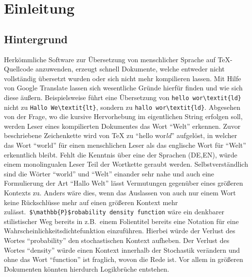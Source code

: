\section{Einleitung}
\subsection{Hintergrund}\label{einleitung:hintergrund}
Herkömmliche Software zur Übersetzung von menschlicher Sprache auf \TeX{}-Quellcode anzuwenden, erzeugt schnell Dokumente, welche entweder nicht vollständig übersetzt wurden oder sich nicht mehr kompilieren lassen. Mit Hilfe von Google Translate lassen sich wesentliche Gründe hierfür finden und wie sich diese äußern. Beispielsweise führt eine Übersetzung von \verb|hello wor\textit{ld}| nicht zu \verb|Hallo We\textit{lt}|, sondern zu \verb|hallo wor\textit{ld}|. Abgesehen von der Frage, wo die kursive Hervorhebung im eigentlichen String erfolgen soll, werden Leser eines kompilierten Dokumentes das Wort \enquote{Welt} erkennen. Zuvor beschriebene Zeichenkette wird von \TeX{} zu \enquote{hello wor\textit{ld}} aufgelöst, in welcher das Wort \enquote{world} für einen menschlichen Leser als das englische Wort für \enquote{Welt} erkenntlich bleibt. Fehlt die Kenntnis über eine der Sprachen (DE,EN), würde einem monolingualen Leser Teil der Wortkette geraubt werden. Selbstverständlich sind die Wörter \enquote{world} und \enquote{Welt} einander sehr nahe und auch eine Formulierung der Art \enquote{Hallo Welt} lässt Vermutungen gegenüber eines größeren Kontexts zu.%
Anders wäre dies, wenn das Auslassen von auch nur einem Wort keine Rückschlüsse mehr auf einen größeren Kontext mehr zulässt.\ \verb|$\mathbb{P}$robability density function| wäre ein denkbarer stilistischer Weg bereits in z.B.\ einem Folientitel bereits eine Notation für eine Wahrscheinlichkeitsdichtefunktion einzuführen. Hierbei würde der Verlust des Wortes \enquote{probability} den stochastischen Kontext aufheben. Der Verlust des Wortes \enquote{density} würde einen Kontext innerhalb der Stochastik verändern und ohne das Wort \enquote{function} ist fraglich, wovon die Rede ist. Vor allem in größeren Dokumenten könnten hierdurch Logikbrüche entstehen.%
\\\noindent

